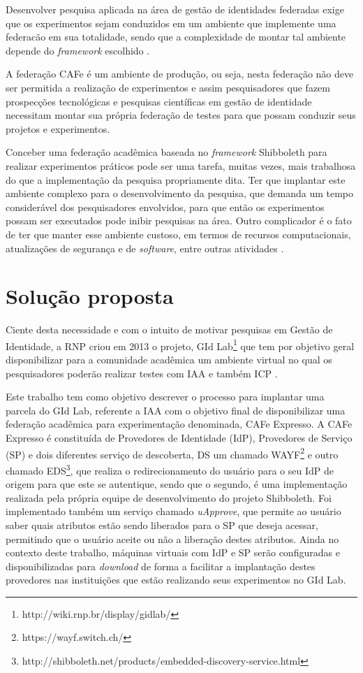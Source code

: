 Desenvolver pesquisa aplicada na área de gestão de identidades federadas exige que os experimentos sejam conduzidos em um ambiente que implemente uma federacão em sua totalidade, sendo que a complexidade de montar tal ambiente depende do \textit{framework} escolhido \cite{wangham:13}.
	
A federação \ac{CAFe} é um ambiente de produção, ou seja, nesta federação não deve ser permitida a realização de experimentos e assim pesquisadores que fazem prospecções tecnológicas e pesquisas científicas em gestão de identidade necessitam montar sua própria federação de testes para que possam conduzir seus projetos e experimentos.
	
Conceber uma federação acadêmica baseada no \textit{framework} Shibboleth para realizar experimentos práticos pode ser uma tarefa, muitas vezes, mais trabalhosa do que a implementação da pesquisa propriamente dita. Ter que implantar este ambiente complexo para o desenvolvimento da pesquisa, que demanda um tempo considerável dos pesquisadores envolvidos, para que então os experimentos possam ser executados pode inibir pesquisas na área. Outro complicador é o fato de ter que manter esse ambiente custoso, em termos de recursos computacionais, atualizações de segurança e de \textit{software}, entre outras atividades \cite{wangham:13}.

\section{Solução proposta}
\label{ci_s_proposta}

Ciente desta necessidade e com o intuito de motivar pesquisas em Gestão de Identidade, a RNP criou em 2013 o projeto, \ac{GId Lab}\footnote{http://wiki.rnp.br/display/gidlab/} que tem por objetivo geral disponibilizar para a comunidade acadêmica um ambiente virtual no qual os pesquisadores poderão realizar testes com \ac{IAA} e também \ac{ICP} \cite{wangham:13}.

Este trabalho tem como objetivo descrever o processo para implantar uma parcela do GId Lab, referente a IAA com o objetivo final de disponibilizar uma federação acadêmica para experimentação denominada, CAFe Expresso. A CAFe Expresso é constituída de Provedores de Identidade (IdP), Provedores de Serviço (SP) e dois diferentes serviço de descoberta, \ac{DS} um chamado \ac{WAYF}\footnote{https://wayf.switch.ch/} e outro chamado \ac{EDS}\footnote{http://shibboleth.net/products/embedded-discovery-service.html}, que realiza o redirecionamento do usuário para o seu IdP de origem para que este se autentique, sendo que o segundo, é uma implementação realizada pela própria equipe de desenvolvimento do projeto Shibboleth. Foi implementado também um serviço chamado \textit{uApprove}, que permite ao usuário saber quais atributos estão sendo liberados para o SP que deseja acessar, permitindo que o usuário aceite ou não a liberação destes atributos. Ainda no contexto deste trabalho, máquinas virtuais com IdP e SP serão configuradas e disponibilizadas para \textit{download} de forma a facilitar a implantação destes provedores nas instituições que estão realizando seus experimentos no GId Lab.


